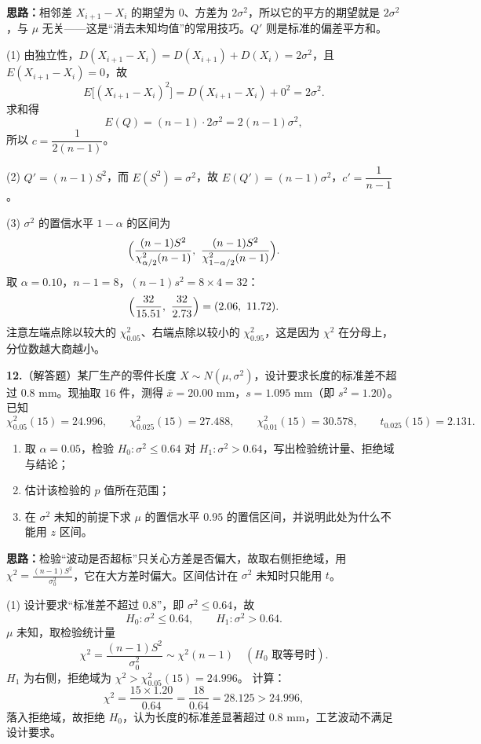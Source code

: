 \ifshowsolutions%
\textbf{思路：}相邻差 $X_{i+1}-X_i$ 的期望为 $0$、方差为 $2\sigma^{2}$，所以它的平方的期望就是 $2\sigma^{2}$，与 $\mu$ 无关——这是“消去未知均值”的常用技巧。$Q'$ 则是标准的偏差平方和。

(1) 由独立性，$D(X_{i+1}-X_i)=D(X_{i+1})+D(X_i)=2\sigma^{2}$，且 $E(X_{i+1}-X_i)=0$，故
\[
E\bigl[(X_{i+1}-X_i)^{2}\bigr]=D(X_{i+1}-X_i)+0^{2}=2\sigma^{2}.
\]
求和得
\[
E(Q)=(n-1)\cdot2\sigma^{2}=2(n-1)\sigma^{2},
\]
所以 $c=\dfrac{1}{2(n-1)}$。

(2) $Q'=(n-1)S^{2}$，而 $E(S^{2})=\sigma^{2}$，故 $E(Q')=(n-1)\sigma^{2}$，$c'=\dfrac{1}{n-1}$。

(3) $\sigma^{2}$ 的置信水平 $1-\alpha$ 的区间为
\[
\Bigl(\frac{(n-1)S^{2}}{\chi^{2}_{\alpha/2}(n-1)},\
\frac{(n-1)S^{2}}{\chi^{2}_{1-\alpha/2}(n-1)}\Bigr).
\]
取 $\alpha=0.10$，$n-1=8$，$(n-1)s^{2}=8\times4=32$：
\[
\Bigl(\frac{32}{15.51},\ \frac{32}{2.73}\Bigr)=(2.06,\ 11.72).
\]
注意左端点除以较大的 $\chi^{2}_{0.05}$、右端点除以较小的 $\chi^{2}_{0.95}$，这是因为 $\chi^{2}$ 在分母上，分位数越大商越小。


\else \answerarea[8] \fi%
\textbf{12.}（解答题）某厂生产的零件长度 $X\sim N(\mu,\sigma^{2})$，设计要求长度的标准差不超过 $0.8$ mm。现抽取 $16$ 件，测得 $\bar x=20.00$ mm，$s=1.095$ mm（即 $s^{2}=1.20$）。已知
\[
\chi^{2}_{0.05}(15)=24.996,\qquad
\chi^{2}_{0.025}(15)=27.488,\qquad
\chi^{2}_{0.01}(15)=30.578,\qquad
t_{0.025}(15)=2.131 .
\]
\begin{enumerate}[label=(\arabic*)]
    \item 取 $\alpha=0.05$，检验 $H_0:\sigma^{2}\leqslant0.64$ 对 $H_1:\sigma^{2}>0.64$，写出检验统计量、拒绝域与结论；
    \item 估计该检验的 $p$ 值所在范围；
    \item 在 $\sigma^{2}$ 未知的前提下求 $\mu$ 的置信水平 $0.95$ 的置信区间，并说明此处为什么不能用 $z$ 区间。
\end{enumerate}

\ifshowsolutions%
\textbf{思路：}检验“波动是否超标”只关心方差是否偏大，故取右侧拒绝域，用 $\chi^{2}=\frac{(n-1)S^{2}}{\sigma_0^{2}}$，它在大方差时偏大。区间估计在 $\sigma^{2}$ 未知时只能用 $t$。

(1) 设计要求“标准差不超过 $0.8$”，即 $\sigma^{2}\leqslant0.64$，故
\[
H_0:\sigma^{2}\leqslant0.64,\qquad H_1:\sigma^{2}>0.64 .
\]
$\mu$ 未知，取检验统计量
\[
\chi^{2}=\frac{(n-1)S^{2}}{\sigma_0^{2}}\sim\chi^{2}(n-1)\quad(H_0\text{ 取等号时}).
\]
$H_1$ 为右侧，拒绝域为 $\chi^{2}>\chi^{2}_{0.05}(15)=24.996$。
计算：
\[
\chi^{2}=\frac{15\times1.20}{0.64}=\frac{18}{0.64}=28.125>24.996 ,
\]
落入拒绝域，故拒绝 $H_0$，认为长度的标准差显著超过 $0.8$ mm，工艺波动不满足设计要求。

